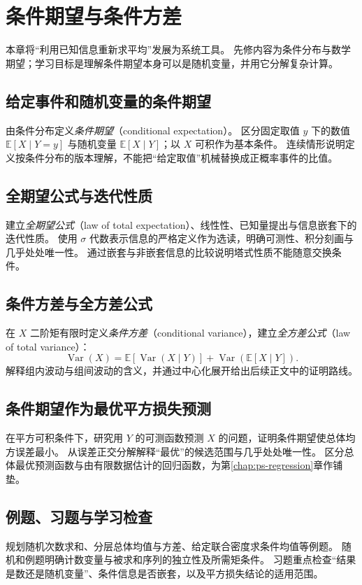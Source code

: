 \setcounter{chapter}{6} %
\chapter{条件期望与条件方差}
\label{chap:ps-conditional-expectation}

本章将“利用已知信息重新求平均”发展为系统工具。
先修内容为条件分布与数学期望；学习目标是理解条件期望本身可以是随机变量，并用它分解复杂计算。

\section{给定事件和随机变量的条件期望}
\label{sec:ps-conditional-expectation-definition}
由条件分布定义\emph{条件期望}（conditional expectation）。
区分固定取值 $y$ 下的数值 $\mathbb E[X\mid Y=y]$ 与随机变量 $\mathbb E[X\mid Y]$；以 $X$ 可积作为基本条件。
连续情形说明定义按条件分布的版本理解，不能把“给定取值”机械替换成正概率事件的比值。

\section{全期望公式与迭代性质}
\label{sec:ps-tower-property}
建立\emph{全期望公式}（law of total expectation）、线性性、已知量提出与信息嵌套下的迭代性质。
使用 $\sigma$ 代数表示信息的严格定义作为选读，明确可测性、积分刻画与几乎处处唯一性。
通过嵌套与非嵌套信息的比较说明塔式性质不能随意交换条件。

\section{条件方差与全方差公式}
\label{sec:ps-total-variance}
在 $X$ 二阶矩有限时定义\emph{条件方差}（conditional variance），建立\emph{全方差公式}（law of total variance）：
\begin{equation}
  \operatorname{Var}(X)
  =\mathbb E[\operatorname{Var}(X\mid Y)]
  +\operatorname{Var}(\mathbb E[X\mid Y]).
  \label{eq:ps-total-variance}
\end{equation}
解释组内波动与组间波动的含义，并通过中心化展开给出后续正文中的证明路线。

\section{条件期望作为最优平方损失预测}
\label{sec:ps-conditional-prediction}
在平方可积条件下，研究用 $Y$ 的可测函数预测 $X$ 的问题，证明条件期望使总体均方误差最小。
从误差正交分解解释“最优”的候选范围与几乎处处唯一性。
区分总体最优预测函数与由有限数据估计的回归函数，为第\ref{chap:ps-regression}章作铺垫。

\section{例题、习题与学习检查}
规划随机次数求和、分层总体均值与方差、给定联合密度求条件均值等例题。
随机和例题明确计数变量与被求和序列的独立性及所需矩条件。
习题重点检查“结果是数还是随机变量”、条件信息是否嵌套，以及平方损失结论的适用范围。






